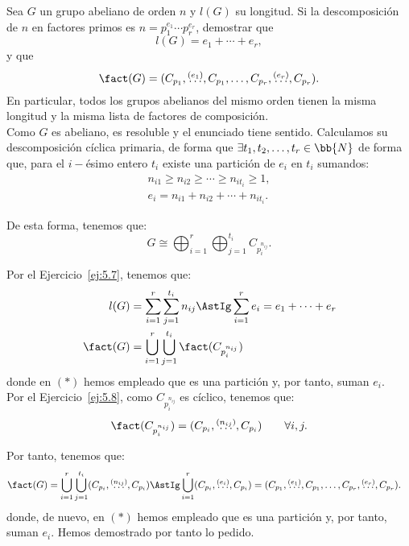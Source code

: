 \begin{ejercicio}\label{ej:7.5}
    Sea $G$ un grupo abeliano de orden $n$ y $l(G)$ su longitud. Si la descomposición de $n$ en factores primos es $n = p_1^{e_1} \cdots p_r^{e_r}$, demostrar que
    \begin{equation*}
        l(G) = e_1 + \cdots + e_r,
    \end{equation*}
    y que
    \begin{equation*}
        \fact(G) = (C_{p_1},\stackrel{(e_1)}{\ldots}, C_{p_1}, \ldots, C_{p_r},\stackrel{(e_r)}{\ldots}, C_{p_r}).
    \end{equation*}
    En particular, todos los grupos abelianos del mismo orden tienen la misma longitud y la misma lista de factores de composición.\\

    Como $G$ es abeliano, es resoluble y el enunciado tiene sentido. Calculamos su descomposición cíclica primaria, de forma que $\exists t_1,t_2,\dots,t_r\in \bb{N}$ de forma que, para el $i-$ésimo entero $t_i$ existe una partición de $e_i$ en $t_i$ sumandos:
    \begin{gather*}
        n_{i1} \geq n_{i2} \geq \cdots \geq n_{it_i} \geq 1, \\
        e_i = n_{i1} + n_{i2} + \cdots + n_{it_i}.
    \end{gather*}

    De esta forma, tenemos que:
    \begin{equation*}
        G \cong \bigoplus_{i=1}^r \bigoplus_{j=1}^{t_i} C_{p_i^{n_{ij}}}.
    \end{equation*}

    Por el Ejercicio~\ref{ej:5.7}, tenemos que:
    \begin{align*}
        l(G) &= \sum_{i=1}^r \sum_{j=1}^{t_i} n_{ij} \AstIg \sum_{i=1}^r e_i = e_1 + \cdots + e_r\\
        \fact(G) &= \bigcup_{i=1}^r \bigcup_{j=1}^{t_i} \fact(C_{p_i^{n_{ij}}})
    \end{align*}
    donde en $(\ast)$ hemos empleado que es una partición y, por tanto, suman $e_i$.\\

    Por el Ejercicio~\ref{ej:5.8}, como $C_{p_i^{n_{ij}}}$ es cíclico, tenemos que:
    \begin{equation*}
        \fact(C_{p_i^{n_{ij}}}) = (C_{p_i},\stackrel{(n_{ij})}{\ldots}, C_{p_i})\qquad \forall i,j.
    \end{equation*}

    Por tanto, tenemos que:
    \begin{align*}
        \fact(G) &= \bigcup_{i=1}^r \bigcup_{j=1}^{t_i} (C_{p_i},\stackrel{(n_{ij})}{\ldots}, C_{p_i}) \AstIg \bigcup_{i=1}^r (C_{p_i},\stackrel{(e_i)}{\ldots}, C_{p_i})
        = (C_{p_1},\stackrel{(e_1)}{\ldots}, C_{p_1}, \ldots, C_{p_r},\stackrel{(e_r)}{\ldots}, C_{p_r}).
    \end{align*}
    donde, de nuevo, en $(\ast)$ hemos empleado que es una partición y, por tanto, suman $e_i$. Hemos demostrado por tanto lo pedido.
\end{ejercicio}

